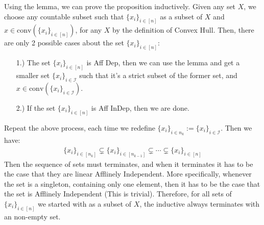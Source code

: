 \documentclass[]{article}
\theoremstyle{definition}
\begin{document}
    \noindent
    Using the lemma, we can prove the proposition inductively. Given any set $X$, we choose any countable subset such that $\{x_i\}_{i\in [n]}$ as a subset of $X$ and $x\in \text{conv}(\{x_i\}_{i \in [n]})$, for any $X$ by the definition of Convex Hull. Then, there are only 2 possible cases about the set $\{x_i\}_{i \in [n]}$: 
    \begin{enumerate}
        \item [1.)] The set $\{x_i\}_{i\in [n]}$ is Aff Dep, then we can use the lemma and get a smaller set $\{x_i\}_{i\in \mathcal I}$ such that it's a strict subset of the former set, and $x\in \text{conv}(\{x_i\}_{i \in\mathcal I})$. 
        \item [2.)] If the set $\{x_i\}_{i \in [n]}$ is Aff InDep, then we are done. 
    \end{enumerate}
    Repeat the above process, each time we redefine $\{x_i\}_{i\in n_k} := \{x_i\}_{i\in \mathcal I}$. Then we have: 
    \begin{align}
        \{x_i\}_{i\in [n_k]}\subsetneq 
        \{x_i\}_{i\in [n_{k - 1}]} \subsetneq \cdots 
        \subsetneq \{x_i\}_{i \in [n]}
    \end{align}
    Then the sequence of sets must terminates, and when it terminates it has to be the case that they are linear Afflinely Independent. More specifically, whenever the set is a singleton, containing only one element, then it has to be the case that the set is Afflinely Independent (This is trivial). Therefore, for all sets of $\{x_i\}_{i\in [n]}$ we started with as a subset of $X$, the inductive always terminates with an non-empty set. 
\end{document}
